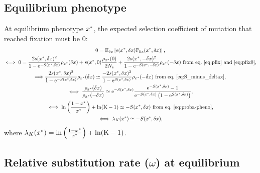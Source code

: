 \documentclass{article}
\begin{document}
\subsection{Equilibrium phenotype}
\label{subsec:equilibrium-phenotype}

At equilibrium {phenotype} $x^{*}$, the expected selection coefficient of mutation that reached fixation must be $0$:
\begin{gather}
    0 = \operatorname{\mathbb{E}}_{\delta x} \left[ s(x^{*}, \delta x) \mathbb{P}_{\text{fix}}(x^{*}, \delta x) \right], \\
    \iff 0 = \frac{ 2 s(x^{*}, \delta x)^2}{1 - \text{e}^{-S(x^{*}, \delta x)}}   \rho_{x^{*}}(\delta x) + s(x^{*}, 0) \frac{ \rho_{x^{*}}(0)}{2N_{\text{e}}} + \frac{ 2s(x^{*}, -\delta x)^2}{1 - \text{e}^{-S(x^{*}, -\delta x)}} \rho_{x^{*}}(-\delta x)\text{ from eq.~\ref{eq:pfix} and~\ref{eq:pfix0}}, \\
    \Longrightarrow \frac{ 2s(x^{*}, \delta x)^2}{1 - \text{e}^{-S(x^{*}, \delta x)}}   \rho_{x^{*}}(\delta x) \simeq \frac{ - 2s(x^{*}, \delta x)^2}{1 - \text{e}^{S(x^{*}, \delta x)}}   \rho_{x^{*}}(-\delta x) \text{ from eq.~\ref{eq:S_minus_deltax}}, \\
    \iff \frac{ \rho_{x^{*}}(\delta x)}{\rho_{x^{*}}(-\delta x)} \simeq \text{e}^{-S(x^{*}, \delta x)} \frac{ \text{e}^{-S(x^{*}, \delta x)} - 1}{ \text{e}^{-S(x^{*}, \delta x)} \left( 1 - \text{e}^{S(x^{*}, \delta x)} \right)}, \\
    \iff \ln \left( \frac{1 - x^{*}}{x^{*}} \right) + \ln (\text{K}-1) \simeq -S(x^{*}, \delta x) \text{ from eq.~\ref{eq:proba-pheno}} \label{eq:equilibrium-pheno}, \\
    \iff \lambda_{K}(x^{*}) \simeq -S(x^{*}, \delta x) \label{eq:equilibrium_lambda},
\end{gather}
where  $\lambda_{K}(x^{*}) = \ln \left( \frac{1 - x^{*}}{x^{*}} \right) + \ln (\text{K}-1)$.

\subsection{Relative substitution rate (\texorpdfstring{$\omega$}{ω}) at equilibrium}
\label{subsec:mean-scaled-fixation-probability-omega-at-equilibrium}
\end{document}
